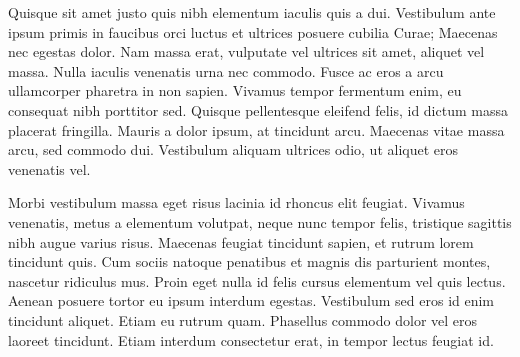 Quisque sit amet justo quis nibh elementum iaculis quis a dui. Vestibulum ante ipsum primis in faucibus orci luctus et ultrices posuere cubilia Curae; Maecenas nec egestas dolor. Nam massa erat, vulputate vel ultrices sit amet, aliquet vel massa. Nulla iaculis venenatis urna nec commodo. Fusce ac eros a arcu ullamcorper pharetra in non sapien. Vivamus tempor fermentum enim, eu consequat nibh porttitor sed. Quisque pellentesque eleifend felis, id dictum massa placerat fringilla. Mauris a dolor ipsum, at tincidunt arcu. Maecenas vitae massa arcu, sed commodo dui. Vestibulum aliquam ultrices odio, ut aliquet eros venenatis vel.

Morbi vestibulum massa eget risus lacinia id rhoncus elit feugiat. Vivamus venenatis, metus a elementum volutpat, neque nunc tempor felis, tristique sagittis nibh augue varius risus. Maecenas feugiat tincidunt sapien, et rutrum lorem tincidunt quis. Cum sociis natoque penatibus et magnis dis parturient montes, nascetur ridiculus mus. Proin eget nulla id felis cursus elementum vel quis lectus. Aenean posuere tortor eu ipsum interdum egestas. Vestibulum sed eros id enim tincidunt aliquet. Etiam eu rutrum quam. Phasellus commodo dolor vel eros laoreet tincidunt. Etiam interdum consectetur erat, in tempor lectus feugiat id. 